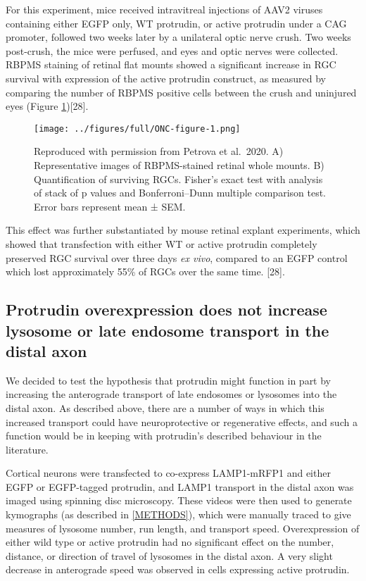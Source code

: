 \documentclass[
  12pt,
  a4paper,
]{book}
\begin{document}
For this experiment, mice received intravitreal injections of AAV2 viruses containing either EGFP only, WT protrudin, or active protrudin under a CAG promoter, followed two weeks later by a unilateral optic nerve crush. Two weeks post-crush, the mice were perfused, and eyes and optic nerves were collected. RBPMS staining of retinal flat mounts showed a significant increase in RGC survival with expression of the active protrudin construct, as measured by comparing the number of RBPMS positive cells between the crush and uninjured eyes (Figure \ref{fig:ONC-figure}){[}28{]}.

\begin{figure}
\centering
\texttt{[image: ../figures/full/ONC-figure-1.png]}
\caption{\label{fig:ONC-figure}Reproduced with permission from Petrova et al.~2020. A) Representative images of RBPMS-stained retinal whole mounts. B) Quantification of surviving RGCs. Fisher's exact test with analysis of stack of p values and Bonferroni--Dunn multiple comparison test. Error bars represent mean ± SEM.}
\end{figure}

This effect was further substantiated by mouse retinal explant experiments, which showed that transfection with either WT or active protrudin completely preserved RGC survival over three days \emph{ex vivo}, compared to an EGFP control which lost approximately 55\% of RGCs over the same time. {[}28{]}.

\hypertarget{lyso-LE}{%
\subsection{Protrudin overexpression does not increase lysosome or late endosome transport in the distal axon}\label{lyso-LE}}

We decided to test the hypothesis that protrudin might function in part by increasing the anterograde transport of late endosomes or lysosomes into the distal axon. As described above, there are a number of ways in which this increased transport could have neuroprotective or regenerative effects, and such a function would be in keeping with protrudin's described behaviour in the literature.

Cortical neurons were transfected to co-express LAMP1-mRFP1 and either EGFP or EGFP-tagged protrudin, and LAMP1 transport in the distal axon was imaged using spinning disc microscopy. These videos were then used to generate kymographs (as described in \ref{METHODS}), which were manually traced to give measures of lysosome number, run length, and transport speed. Overexpression of either wild type or active protrudin had no significant effect on the number, distance, or direction of travel of lysosomes in the distal axon. A very slight decrease in anterograde speed was observed in cells expressing active protrudin.
\end{document}
